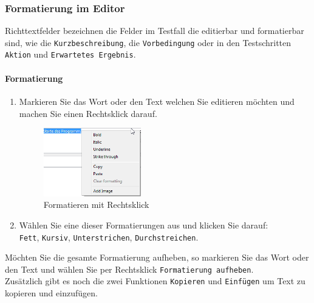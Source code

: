 \documentclass[11pt,a4paper,titlepage]{article}
\begin{document}
\subsubsection{Formatierung im Editor}
Richttextfelder bezeichnen die Felder im Testfall die editierbar und formatierbar sind, wie die \texttt{Kurzbeschreibung}, die \texttt{Vorbedingung} oder 
in den Testschritten \texttt{Aktion} und \texttt{Erwartetes Ergebnis}.
\paragraph{Formatierung}
\begin{enumerate}
\item Markieren Sie das Wort oder den Text welchen Sie editieren möchten und machen Sie einen Rechtsklick darauf.

\begin{figure}[H]
\centering
\includegraphics[width= 160px]{BilderHandbuch/Testfall/Formatieren.png}
\caption{Formatieren mit Rechtsklick}
\label{fig:AddImage}
\end{figure}

\item Wählen Sie eine dieser Formatierungen aus und klicken Sie darauf:\\
\texttt{Fett}, \texttt{Kursiv}, \texttt{Unterstrichen}, \texttt{Durchstreichen}.
\end{enumerate}
Möchten Sie die gesamte Formatierung aufheben, so markieren Sie das Wort oder den Text und wählen Sie per Rechtsklick \texttt{Formatierung aufheben}.\\
Zusätzlich gibt es noch die zwei Funktionen \texttt{Kopieren} und \texttt{Einfügen} um Text zu kopieren und einzufügen. 
\end{document}

